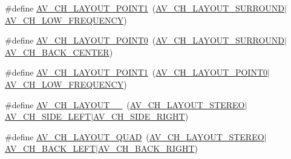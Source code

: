 \begin{DoxyCompactItemize}
\item 
\#define \hyperlink{group__channel__mask__c_gae3fc8d83d40cfbd4910b16d526beb294}{A\+V\+\_\+\+C\+H\+\_\+\+L\+A\+Y\+O\+U\+T\+\_\+P\+O\+I\+N\+T1}~(\hyperlink{group__channel__mask__c_ga625aec7f2285dc35e3ed801e91889564}{A\+V\+\_\+\+C\+H\+\_\+\+L\+A\+Y\+O\+U\+T\+\_\+\+S\+U\+R\+R\+O\+U\+ND}$\vert$\hyperlink{group__channel__masks_gab19b66e345cf1f9d50ffc26c28862bcc}{A\+V\+\_\+\+C\+H\+\_\+\+L\+O\+W\+\_\+\+F\+R\+E\+Q\+U\+E\+N\+CY})
\item 
\#define \hyperlink{group__channel__mask__c_ga0bcbe41f2d3214b0a3fd2698ebe0caf9}{A\+V\+\_\+\+C\+H\+\_\+\+L\+A\+Y\+O\+U\+T\+\_\+P\+O\+I\+N\+T0}~(\hyperlink{group__channel__mask__c_ga625aec7f2285dc35e3ed801e91889564}{A\+V\+\_\+\+C\+H\+\_\+\+L\+A\+Y\+O\+U\+T\+\_\+\+S\+U\+R\+R\+O\+U\+ND}$\vert$\hyperlink{group__channel__masks_ga68650a364e52edb62d5984dddec4f935}{A\+V\+\_\+\+C\+H\+\_\+\+B\+A\+C\+K\+\_\+\+C\+E\+N\+T\+ER})
\item 
\#define \hyperlink{group__channel__mask__c_gacc48c498c05b3b3c2549f715ba4f1d1b}{A\+V\+\_\+\+C\+H\+\_\+\+L\+A\+Y\+O\+U\+T\+\_\+P\+O\+I\+N\+T1}~(\hyperlink{group__channel__mask__c_ga0bcbe41f2d3214b0a3fd2698ebe0caf9}{A\+V\+\_\+\+C\+H\+\_\+\+L\+A\+Y\+O\+U\+T\+\_\+P\+O\+I\+N\+T0}$\vert$\hyperlink{group__channel__masks_gab19b66e345cf1f9d50ffc26c28862bcc}{A\+V\+\_\+\+C\+H\+\_\+\+L\+O\+W\+\_\+\+F\+R\+E\+Q\+U\+E\+N\+CY})
\item 
\#define \hyperlink{group__channel__mask__c_ga5c25ee8b976d0cb15e0b6d2cf923d19d}{A\+V\+\_\+\+C\+H\+\_\+\+L\+A\+Y\+O\+U\+T\+\_\+\_}~(\hyperlink{group__channel__mask__c_gabc6d6651bba254cd0fa2c42a57228e65}{A\+V\+\_\+\+C\+H\+\_\+\+L\+A\+Y\+O\+U\+T\+\_\+\+S\+T\+E\+R\+EO}$\vert$\hyperlink{group__channel__masks_ga02e55f35249dfa57a2e4edfd3acfec4f}{A\+V\+\_\+\+C\+H\+\_\+\+S\+I\+D\+E\+\_\+\+L\+E\+FT}$\vert$\hyperlink{group__channel__masks_ga947b60ab70c428ebb07c8b9c87023b39}{A\+V\+\_\+\+C\+H\+\_\+\+S\+I\+D\+E\+\_\+\+R\+I\+G\+HT})
\item 
\#define \hyperlink{group__channel__mask__c_ga0982ce29eced939dfcfb5b52416810ae}{A\+V\+\_\+\+C\+H\+\_\+\+L\+A\+Y\+O\+U\+T\+\_\+\+Q\+U\+AD}~(\hyperlink{group__channel__mask__c_gabc6d6651bba254cd0fa2c42a57228e65}{A\+V\+\_\+\+C\+H\+\_\+\+L\+A\+Y\+O\+U\+T\+\_\+\+S\+T\+E\+R\+EO}$\vert$\hyperlink{group__channel__masks_gaa3cae8c6d0eaab3dc3ce178f6af81ae2}{A\+V\+\_\+\+C\+H\+\_\+\+B\+A\+C\+K\+\_\+\+L\+E\+FT}$\vert$\hyperlink{group__channel__masks_ga7a7ab3bb418bf9672dcdf6554346e5eb}{A\+V\+\_\+\+C\+H\+\_\+\+B\+A\+C\+K\+\_\+\+R\+I\+G\+HT})
\item 

\end{DoxyCompactItemize}
